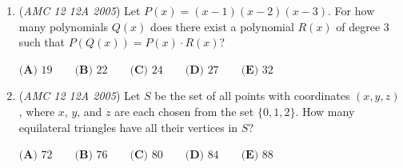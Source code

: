 \begin{enumerate}
 $\textbf{(A) } \frac{2}{25} \qquad \textbf{(B) } \frac{31}{300} \qquad \textbf{(C) } \frac{13}{100} \qquad \textbf{(D) } \frac{7}{50} \qquad \textbf{(E) } \frac{1}{2}$


	\item (\textit{AMC 12 12A 2005}) Let $P(x) = (x - 1)(x - 2)(x - 3)$. For how many polynomials $Q(x)$ does there exist a polynomial $R(x)$ of degree $3$ such that $P(Q(x)) = P(x) \cdot R(x)$?


 $\textbf{(A) } 19 \qquad \textbf{(B) } 22 \qquad \textbf{(C) } 24 \qquad \textbf{(D) } 27 \qquad \textbf{(E) } 32$


	\item (\textit{AMC 12 12A 2005}) Let $S$ be the set of all points with coordinates $(x,y,z)$, where $x$, $y$, and $z$ are each chosen from the set $\{0, 1, 2\}$. How many equilateral triangles have all their vertices in $S$?


 $\textbf{(A) } 72 \qquad \textbf{(B) } 76 \qquad \textbf{(C) } 80 \qquad \textbf{(D) } 84 \qquad \textbf{(E) } 88$


\end{enumerate}